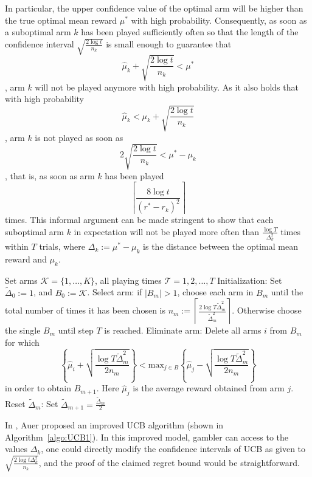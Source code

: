 In particular, the upper confidence value of the optimal arm will be higher than the true optimal mean reward $\mu^{\ast}$ with high probability. Consequently, as soon as a suboptimal arm $k$ has been played sufficiently often so that the length of the confidence interval $\sqrt{\frac{2\log{t}}{n_k}}$ is small enough to guarantee that
\[\hat{\mu}_k+\sqrt{\frac{2\log{t}}{n_k}} < \mu^{\ast}
\],
arm $k$ will not be played anymore with high probability. As it also holds that with high probability
\[\hat{\mu}_k<\mu_k+\sqrt{\frac{2\log{t}}{n_k}}\],
arm $k$ is not played as soon as 
\[2\sqrt{\frac{2\log{t}}{n_k}}<\mu^{\ast}-\mu_k\],
that is, as soon as arm $k$ has been played
\[\left \lceil \frac{8\log{t}}{(r^{\ast}-r_k)^2} \right \rceil\]
times. This informal argument can be made stringent to show that each suboptimal arm $k$ in expectation will not be played more often than $\frac{\log{T}}{\Delta_k^2}$ times within $T$ trials, 
where $\Delta_k:=\mu^{\ast}-\mu_k$ is the distance between the optimal mean reward and $\mu_k$.

\begin{algo}
\label{algo:UCB1}
\begin{algorithmic}
\STATE {\ }
\STATE Set arms $\mathscr{K}= \{1,\dots,K\}$, all playing times $\mathscr{T} = 1,2, \dots, T$
\STATE Initialization: Set $\tilde{\Delta}_0:=1$, and $B_0:=\mathscr{K}$.
	\STATE Select arm: if $|B_m|>1$, choose each arm in $B_m$ until the total number of times it has been chosen is $n_m:= \left \lceil \frac{2\log{T\tilde{\Delta}^2_m}}{\tilde{\Delta}^2_m} \right \rceil$. Otherwise choose the single $B_m$ until step $T$ is reached.
	\STATE Eliminate arm: Delete all arms $i$ from $B_m$ for which
    \[ \left\{ \hat{\mu}_i+\sqrt{\frac{\log{T\tilde{\Delta}^2_m}}{2n_m}} \right\} < \text{max}_{j\in B} \left\{ \hat{\mu}_j - \sqrt{\frac{\log{T\tilde{\Delta}^2_m}}{2n_m}}\right\} \] in order to obtain $B_{m+1}$. Here $\hat{\mu}_j$ is the average reward obtained from arm $j$.
    \STATE	Reset $\tilde{\Delta}_m$: Set $\tilde{\Delta}_{m+1} = \frac{\tilde{\Delta}_m}{2}$
\ENDFOR
\end{algorithmic}
\end{algo}

In \cite{auer2010ucb}, Auer proposed an improved UCB algorithm (shown in Algorithm~\ref{algo:UCB1}). In this improved model, gambler can access to the values $\Delta_k$, one could directly modify the confidence intervals of UCB as given \cite{agrawal1995sample} to $\sqrt{\frac{2\log{t\Delta_k^2}}{n_k}}$, and the proof of the claimed regret bound would be straightforward.

